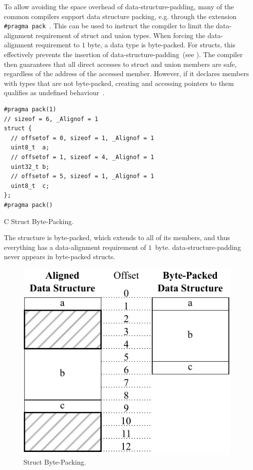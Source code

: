 To allow avoiding the space overhead of \gls{data-structure-padding}, many of the common compilers support data structure packing, e.g. through the  extension \lstinline{#pragma pack}~\cite{msft-pack}. This can be used to instruct the compiler to limit the \gls{data-alignment} requirement of struct and union types. When forcing the \gls{data-alignment} requirement to $1$ \gls{byte}, a data type is \gls{byte-packed}. For structs, this effectively prevents the insertion of \gls{data-structure-padding}~(see ). The compiler then guarantees that all direct accesses to struct and union members are safe, regardless of the address of the accessed member. However, if it declares members with types that are not \gls{byte-packed}, creating and accessing pointers to them qualifies as undefined behaviour~\cite{ISO:2018:III}.

\begin{lstfloat}[htb]
  \centering
  \begin{lstlisting}[style=c]
#pragma pack(1)
// sizeof = 6, _Alignof = 1
struct {
  // offsetof = 0, sizeof = 1, _Alignof = 1
  uint8_t  a;
  // offsetof = 1, sizeof = 4, _Alignof = 1
  uint32_t b;
  // offsetof = 5, sizeof = 1, _Alignof = 1
  uint8_t  c;
};
#pragma pack()
  \end{lstlisting}
  \caption{C Struct Byte-Packing.}
  \label{fig:packed_struct}
  \caption*{The structure is \gls{byte-packed}, which extends to all of its members, and thus everything has a \gls{data-alignment} requirement of $1$~\gls{byte}. \Gls{data-structure-padding} never appears in \gls{byte-packed} structs.}
\end{lstfloat}

\begin{figure}[htb]
  \centering
  \includegraphics{Figures/AlignedVsPacked.pdf}
  \caption{Struct Byte-Packing.}
  \label{fig:aligned_vs_packed}
\end{figure}

